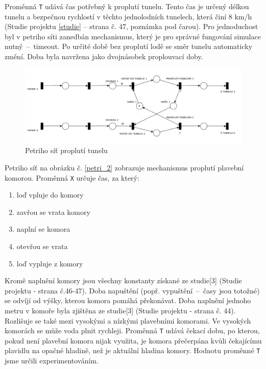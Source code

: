 \documentclass[11pt,a4paper]{article}
\begin{document}
      Proměnná \texttt{T} udává čas potřebný k proplutí tunelu.
      Tento čas je určený délkou tunelu a bezpečnou
      rychlostí v těchto jednolodních tunelech, která činí
      8 km/h (Studie projektu \ref{studie} -- strana č. 47, poznámka pod čarou).
      Pro jednoduchost byl v petriho síti zanedbán mechanismus, který je pro správné
      fungování simulace nutný \,--\, timeout. Po určité době bez proplutí lodě
      se směr tunelu automaticky změní. Doba byla navržena jako dvojnásobek
      proplouvací doby.

      \begin{figure}[H]
        \centering
        \includegraphics[width=1\textwidth, natwidth=940, natheight=325]
                        {petri_net_1.png}
        \caption{Petriho síť proplutí tunelu} \label{petri_1}
      \end{figure}

      \break

      Petriho síť na obrázku č. \ref{petri_2} zobrazuje mechanismus proplutí
      plavební komorou. Proměnná \texttt{X} určuje čas, za který:

      \begin{enumerate}
        \item loď vpluje do komory
        \item zavřou se vrata komory
        \item naplní se komora
        \item otevřou se vrata
        \item loď vypluje z komory
      \end{enumerate}

      Kromě naplnění komory jsou všechny konstanty získané ze
      studie[3] (Studie projektu - strana č.46-47).
      Doba napuštění (popř. vypuštění \,--\, časy jsou totožné) se odvíjí od
      výšky, kterou komora pomáhá překonávat. Doba naplnění jednoho metru v
      komoře byla zjištěna ze studie[3] (Studie projektu - strana č. 44).
      Rozlišuje se také mezi vysokými a nízkými plavebními komorami.
      Ve vysokých komorách se může voda plnit rychleji.
      Proměnná \texttt{T} udává čekací dobu, po kterou, pokud není plavební
      komora nijak využita, je komora přečerpána kvůli čekajícímu plavidlu na
      opačné hladině, než je aktuální hladina komory. Hodnotu proměnné 
      \texttt{T} jsme určili experimentováním.
\end{document}
